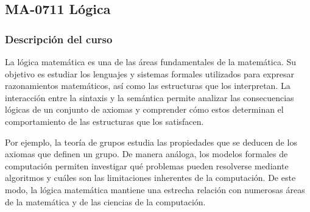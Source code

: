 \newpage
\subsection*{MA-0711 Lógica}

\hypertarget{MA0711}{}
\begin{refsection}
\begin{table}[H]
\end{table}

\subsubsection*{Descripción del curso}

La lógica matemática es una de las áreas fundamentales de la matemática. Su objetivo es estudiar los lenguajes y sistemas formales utilizados para expresar razonamientos matemáticos, así como las estructuras que los interpretan. La interacción entre la sintaxis y la semántica permite analizar las consecuencias lógicas de un conjunto de axiomas y comprender cómo estos determinan el comportamiento de las estructuras que los satisfacen.

Por ejemplo, la teoría de grupos estudia las propiedades que se deducen de los axiomas que definen un grupo. De manera análoga, los modelos formales de computación permiten investigar qué problemas pueden resolverse mediante algoritmos y cuáles son las limitaciones inherentes de la computación. De este modo, la lógica matemática mantiene una estrecha relación con numerosas áreas de la matemática y de las ciencias de la computación.


\end{refsection}
